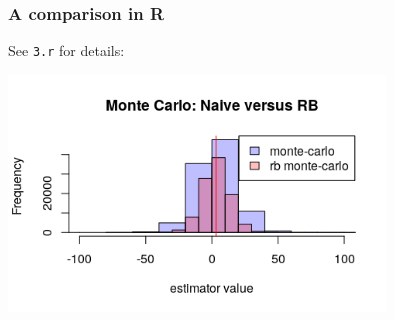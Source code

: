 \documentclass{beamer}
\begin{document}
\begin{frame}[fragile]
\frametitle{A comparison in R}

See \verb|3.r| for details:

\begin{center}
\includegraphics[width=100mm]{pics/Rplot}
\end{center}


\end{frame}
% 
% 
% 
% 
\end{document}
